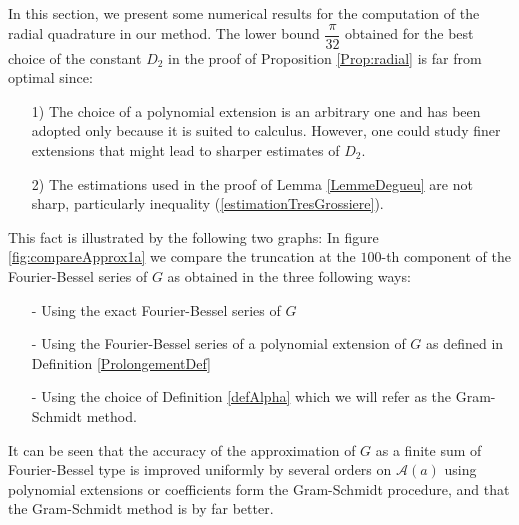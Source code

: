 \documentclass[11pt,a4paper]{article}
\begin{document}
In this section, we present some numerical results for the computation of the radial quadrature in our method. The lower bound $\dfrac{\pi}{32}$ obtained for the best choice of the constant $D_2$ in the proof of Proposition \ref{Prop:radial} is far from optimal since: \begin{itemize}
\item[1)] The choice of a polynomial extension is an arbitrary one and has been adopted only because it is suited to calculus. However, one could study finer extensions that might lead to sharper estimates of $D_2$.
\item[2)] The estimations used in the proof of Lemma \ref{LemmeDegueu} are not sharp, particularly inequality (\ref{estimationTresGrossiere}).
\end{itemize}
This fact is illustrated by the following two graphs: 
In figure \ref{fig:compareApprox1a} we compare the truncation at the $100$-th component of the Fourier-Bessel series of $G$ as obtained in the three following ways: 
\begin{itemize}
\item[-] Using the exact Fourier-Bessel series of $G$
\item[-] Using the Fourier-Bessel series of a polynomial extension of $G$ as defined in Definition \ref{ProlongementDef}
\item[-] Using the choice of Definition \ref{defAlpha} which we will refer as the Gram-Schmidt method. 
\end{itemize}
It can be seen that the accuracy of the approximation of $G$ as a finite sum of Fourier-Bessel type is improved uniformly by several orders on $\mathcal{A}(a)$ using polynomial extensions or coefficients form the Gram-Schmidt procedure, and that the Gram-Schmidt method is by far better. 
\end{document}
